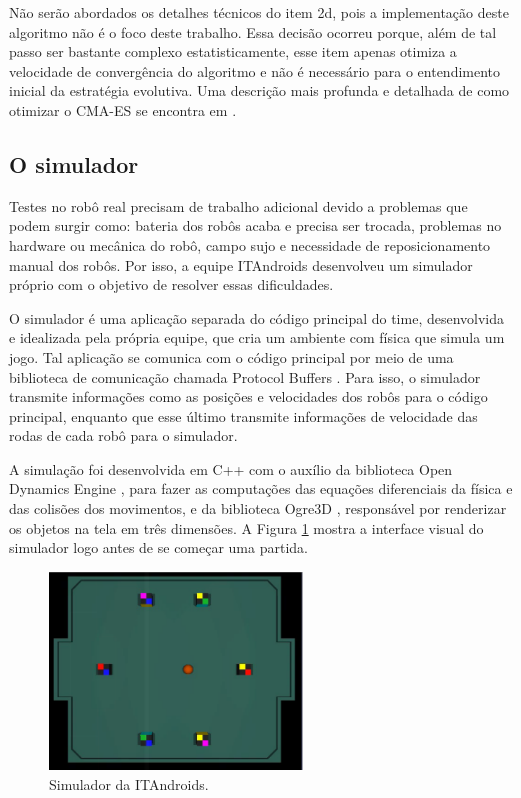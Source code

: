 \documentclass[10pt,fleqn,a4paper]{article}
\begin{document}
Não serão abordados os detalhes técnicos do item 2d, pois a implementação deste algoritmo não é o foco deste trabalho. Essa decisão ocorreu porque, além de tal passo ser bastante complexo estatisticamente, esse item apenas otimiza a velocidade de convergência do algoritmo e não é necessário para o entendimento inicial da estratégia evolutiva. Uma descrição mais profunda e detalhada de como otimizar o CMA-ES se encontra em \cite{CMA-ES}.

\subsection{O simulador}

Testes no robô real precisam de trabalho adicional devido a problemas que podem surgir como: bateria dos robôs acaba e precisa ser trocada, problemas no hardware ou mecânica do robô, campo sujo e necessidade de reposicionamento manual dos robôs. Por isso, a equipe ITAndroids desenvolveu um simulador próprio com o objetivo de resolver essas dificuldades.

O simulador é uma aplicação separada do código principal do time, desenvolvida e idealizada pela própria equipe, que cria um ambiente com física que simula um jogo. Tal aplicação se comunica com o código principal por meio de uma biblioteca de comunicação chamada Protocol Buffers \citep{protobuf}. Para isso, o simulador transmite informações como as posições e velocidades dos robôs para o código principal, enquanto que esse último transmite informações de velocidade das rodas de cada robô para o simulador.

A simulação foi desenvolvida em C++ com o auxílio da biblioteca Open Dynamics Engine \citep{ODE}, para fazer as computações das equações diferenciais da física e das colisões dos movimentos, e da biblioteca Ogre3D \citep{Ogre}, responsável por renderizar os objetos na tela em três dimensões. A Figura \ref{fig:simulator} mostra a interface visual do simulador logo antes de se começar uma partida.

\begin{figure}[H]
	\centering
	\includegraphics[width=0.6\textwidth]{figures/SimulatorWithoutButtons.png}
	\caption{Simulador da ITAndroids.}
	\label{fig:simulator}
\end{figure}
\end{document}
